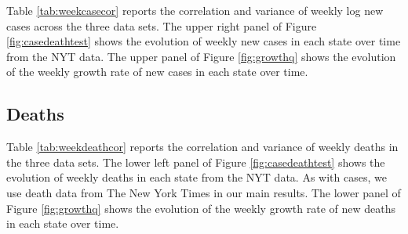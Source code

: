 \documentclass[11pt,reqno,letter]{amsart}
\theoremstyle{definition}
\begin{document}
Table \ref{tab:weekcasecor} reports the correlation and variance of
weekly log new cases across the three data sets. The upper right panel of Figure
\ref{fig:casedeathtest} shows the evolution of weekly new cases in each
state over time  from the NYT data. The upper panel of Figure \ref{fig:growthq} shows the evolution of the weekly growth rate of new cases in each
state over time.




\subsection{Deaths}

Table \ref{tab:weekdeathcor} reports the correlation and variance of
weekly deaths in the three data sets. The lower left panel of Figure \ref{fig:casedeathtest}
shows the evolution of weekly deaths in each state from the NYT data. As with cases, we
use death data from The New York Times in our main results. The lower panel of Figure \ref{fig:growthq} shows the evolution of the weekly growth rate of new deaths in each
state over time.




\end{document}
